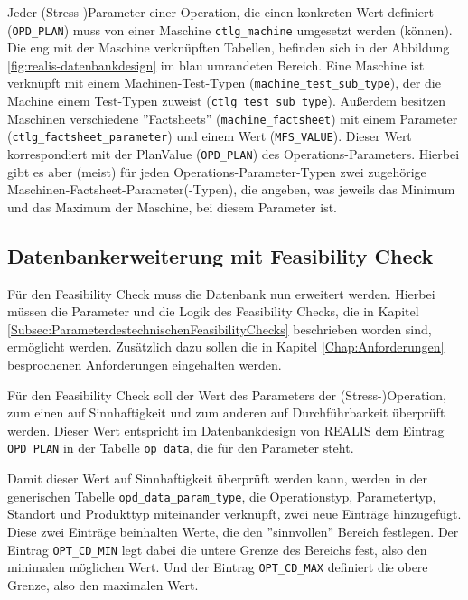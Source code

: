 Jeder (Stress-)Parameter einer Operation, die einen konkreten Wert definiert (\texttt{OPD\_PLAN}) muss von einer Maschine \texttt{ctlg\_machine} umgesetzt werden (können). Die eng mit der Maschine verknüpften Tabellen, befinden sich in der Abbildung \ref{fig:realis-datenbankdesign} im blau umrandeten Bereich. Eine Maschine ist verknüpft mit einem Machinen-Test-Typen (\texttt{machine\_test\_sub\_type}), der die Machine einem Test-Typen zuweist (\texttt{ctlg\_test\_sub\_type}). Außerdem besitzen Maschinen verschiedene ''Factsheets'' (\texttt{machine\_factsheet}) mit einem Parameter (\texttt{ctlg\_factsheet\_parameter}) und einem Wert (\texttt{MFS\_VALUE}). Dieser Wert korrespondiert mit der PlanValue (\texttt{OPD\_PLAN}) des Operations-Parameters. Hierbei gibt es aber (meist) für jeden Operations-Parameter-Typen zwei zugehörige Maschinen-Factsheet-Parameter(-Typen), die angeben, was jeweils das Minimum und das Maximum der Maschine, bei diesem Parameter ist.


\subsection{Datenbankerweiterung mit Feasibility Check}

Für den Feasibility Check muss die Datenbank nun erweitert werden. Hierbei müssen die Parameter und die Logik des Feasibility Checks, die in Kapitel \ref{Subsec:ParameterdestechnischenFeasibilityChecks} beschrieben worden sind, ermöglicht werden. Zusätzlich dazu sollen die in Kapitel \ref{Chap:Anforderungen} besprochenen Anforderungen eingehalten werden.

Für den Feasibility Check soll der Wert des Parameters der (Stress-)Operation, zum einen auf Sinnhaftigkeit und zum anderen auf Durchführbarkeit überprüft werden. Dieser Wert entspricht im Datenbankdesign von \gls{REALIS} dem Eintrag \texttt{OPD\_PLAN} in der Tabelle \texttt{op\_data}, die für den Parameter steht.

Damit dieser Wert auf Sinnhaftigkeit überprüft werden kann, werden in der generischen Tabelle \texttt{opd\_data\_param\_type}, die Operationstyp, Parametertyp, Standort und Produkttyp miteinander verknüpft, zwei neue Einträge hinzugefügt. Diese zwei Einträge beinhalten Werte, die den ''sinnvollen'' Bereich festlegen. Der Eintrag \texttt{OPT\_CD\_MIN} legt dabei die untere Grenze des Bereichs fest, also den minimalen möglichen Wert. Und der Eintrag \texttt{OPT\_CD\_MAX} definiert die obere Grenze, also den maximalen Wert.

